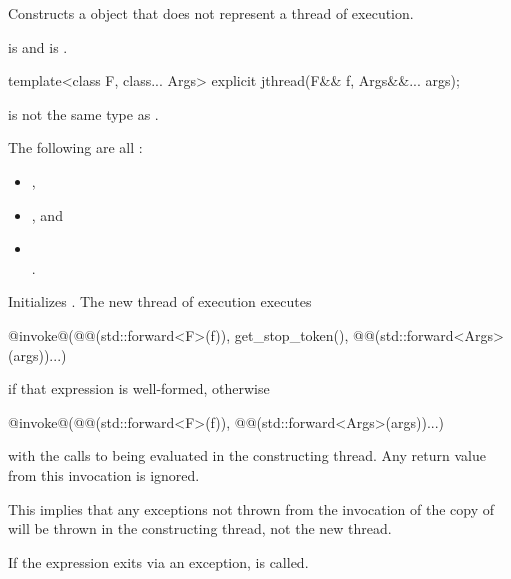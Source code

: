 \begin{itemdescr}
\pnum
\effects
Constructs a  object that does not represent
a thread of execution.

\pnum
\ensures
{} is 
and  is .
\end{itemdescr}

%
\begin{itemdecl}
template<class F, class... Args> explicit jthread(F&& f, Args&&... args);
\end{itemdecl}

\begin{itemdescr}
\pnum
\constraints
{} is not the same type as .

\pnum
\mandates
The following are all :
\begin{itemize}
\item {},
\item {}, and
\item {} \\ .
\end{itemize}

\pnum
\effects
Initializes .
The new thread of execution executes
\begin{codeblock}
@invoke@(@@(std::forward<F>(f)), get_stop_token(),
       @@(std::forward<Args>(args))...)
\end{codeblock}
if that expression is well-formed,
otherwise
\begin{codeblock}
@invoke@(@@(std::forward<F>(f)), @@(std::forward<Args>(args))...)
\end{codeblock}
with the calls to
 being evaluated in the constructing thread.
Any return value from this invocation is ignored.
\begin{note}
This implies that any exceptions not thrown from the invocation of the copy
of  will be thrown in the constructing thread, not the new thread.
\end{note}
If the  expression exits via an exception,
 is called.


\end{itemdescr}
